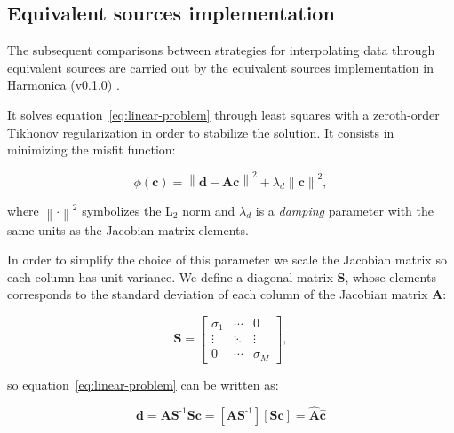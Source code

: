 \documentclass[twocolumn]{article}
\newcommand{\inv}{^{\text{-}1}}
\begin{document}

\subsection{Equivalent sources implementation}
\label{sec:eql-implementation}

The subsequent comparisons between strategies for interpolating data through
equivalent sources are carried out by the equivalent sources implementation in
Harmonica (v0.1.0) \citep{uieda2020}.

It solves equation~\ref{eq:linear-problem} through least squares with
a zeroth-order Tikhonov \citep{tikhonov1977} regularization in order to
stabilize the solution.
It consists in minimizing the misfit function:

\begin{equation}
    \phi(\mathbf{c}) =
        \left\lVert
            \mathbf{d} - \mathbf{A}\mathbf{c}
        \right\rVert ^ 2
        + \lambda_d \left\lVert \mathbf{c} \right\rVert ^2,
    \label{eq:misfit-unscaled}
\end{equation}

\noindent where $\left\lVert \cdot \right\rVert ^ 2$ symbolizes the L$_2$ norm
and $\lambda_d$ is a \emph{damping} parameter with the same units as the
Jacobian matrix elements.

In order to simplify the choice of this parameter we scale the Jacobian matrix
so each column has unit variance.
We define a diagonal matrix $\mathbf{S}$, whose elements corresponds to the
standard deviation of each column of the Jacobian matrix $\mathbf{A}$:

\begin{equation}
    \mathbf{S} =
    \begin{bmatrix}
        \sigma_1 & \cdots &0 \\
        \vdots & \ddots & \vdots \\
        0 & \cdots & \sigma_M
    \end{bmatrix}
    ,
\end{equation}

\noindent so equation~\ref{eq:linear-problem} can be written as:

\begin{equation}
    \mathbf{d}
    =
    \mathbf{A} \mathbf{S}\inv \mathbf{S} \mathbf{c}
    =
    \left[
        \mathbf{A} \mathbf{S}\inv
    \right]
    \left[
        \mathbf{S} \mathbf{c}
    \right]
    =
    \hat{\mathbf{A}} \hat{\mathbf{c}}
\end{equation}
\end{document}
